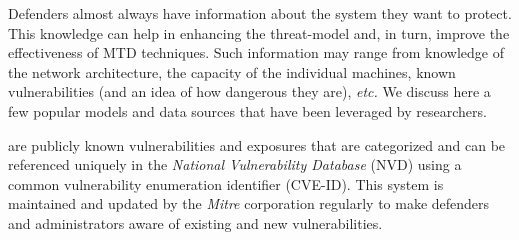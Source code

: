 Defenders almost always have information about the system they want to protect. This knowledge can help in enhancing the threat-model and, in turn, improve the effectiveness of MTD techniques. Such information may range from knowledge of the network architecture, the capacity of the individual machines, known vulnerabilities (and an idea of how dangerous they are), {\em etc.} We discuss here a few popular models and data sources that have been leveraged by researchers.

are publicly known vulnerabilities and exposures that are categorized and can be referenced uniquely in the \emph{National Vulnerability Database} (NVD) using a common vulnerability enumeration identifier (CVE-ID). This system is maintained and updated by the \emph{Mitre} corporation regularly to make defenders and administrators aware of existing and new vulnerabilities.

